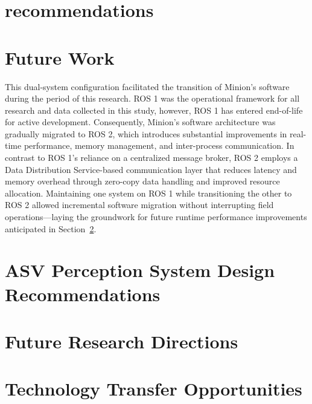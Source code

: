 \documentclass{erauthesis}
\begin{document}
\section{recommendations} \label{reccomendations}

\section{Future Work} \label{futurework}

This dual-system configuration facilitated the transition of Minion's software during the period of this research.
\ac{ROS} 1 was the operational framework for all research and data collected in this study, however, \ac{ROS} 1 has entered end-of-life for active development.
Consequently, Minion’s software architecture was gradually migrated to \ac{ROS} 2, which introduces substantial improvements in real-time performance, memory management, and inter-process communication.
In contrast to ROS 1’s reliance on a centralized message broker, ROS 2 employs a Data Distribution Service-based communication layer that reduces latency and memory overhead through zero-copy data handling and improved resource allocation.
Maintaining one system on ROS 1 while transitioning the other to ROS 2 allowed incremental software migration without interrupting field operations—laying the groundwork for future runtime performance improvements anticipated in Section~\ref{futurework}.


\section{ASV Perception System Design Recommendations}

\section{Future Research Directions}

\section{Technology Transfer Opportunities}
\end{document}
